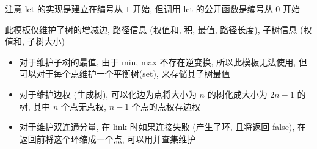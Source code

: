 注意 lct 的实现是建立在编号从 \(1\) 开始, 但调用 lct 的公开函数是编号从 \(0\) 开始

此模板仅维护了树的增减边, 路径信息 (权值和, 积, 最值, 路径长度), 子树信息 (权值和, 子树大小)

\begin{itemize}
    \item 对于维护子树的最值, 由于 min, max 不存在逆变换, 所以此模板无法使用, 但可以对于每个点维护一个平衡树(set), 来存储其子树最值
    \item 对于维护边权 (生成树), 可以化边为点将大小为 \(n\) 的树化成大小为 \(2n - 1\) 的树, 其中 \(n\) 个点无点权, \(n-1\) 个点的点权存边权
    \item 对于维护双连通分量, 在 link 时如果连接失败 (产生了环, 且将返回 false), 在返回前将这个环缩成一个点, 可以用并查集维护
\end{itemize}